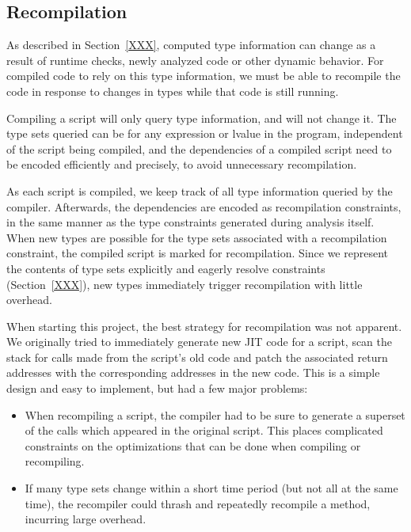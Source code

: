\subsection{Recompilation}

As described in Section~\ref{XXX}, computed type information can change as
a result of runtime checks, newly analyzed code or other dynamic behavior.
For compiled code to rely on this type information, we must be able
to recompile the code in response to changes in types while that code is
still running.

Compiling a script will only query type information, and will not change it.
The type sets queried can be for any expression or lvalue in the program,
independent of the script being compiled,
and the dependencies of a compiled script need to be encoded efficiently
and precisely, to avoid unnecessary recompilation.

As each script is compiled, we keep track of all type information queried
by the compiler.
Afterwards, the dependencies are encoded as recompilation constraints,
in the same manner as the type constraints generated during analysis itself.
When new types are possible for the type sets associated with a recompilation
constraint, the compiled script is marked for recompilation.
Since we represent the contents of type sets explicitly and eagerly resolve
constraints (Section~\ref{XXX}), new types immediately
trigger recompilation with little overhead.

When starting this project, the best strategy for recompilation
was not apparent.
We originally tried to immediately generate new JIT code for a script,
scan the stack for calls made from the script's old code and patch the
associated return addresses with the corresponding addresses in the
new code.
This is a simple design and easy to implement, but had a few major problems:

\begin{itemize}

\item When recompiling a script, the compiler had to be sure to generate
a superset of the calls which appeared in the original script.
This places complicated constraints on the optimizations that
can be done when compiling or recompiling.

\item If many type sets change within a short time period (but not all at
the same time), the recompiler could thrash and repeatedly recompile a
method, incurring large overhead.

\end{itemize}

